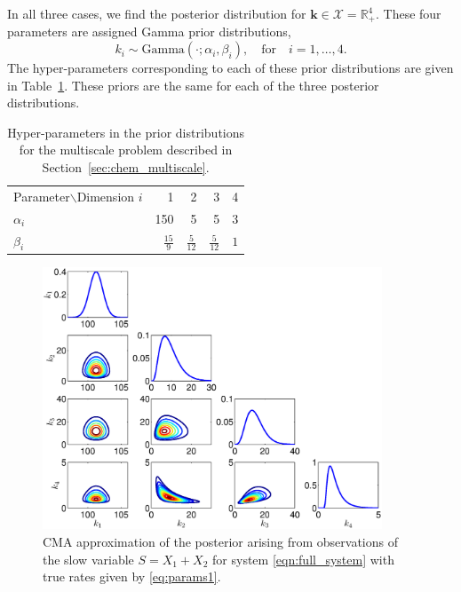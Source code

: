 \documentclass[final]{siamltex}
\begin{document}
In all three cases, we find the posterior distribution for $\mathbf{k}
\in \mathcal{X} = \mathbb{R}_+^4$. These four parameters are assigned Gamma prior distributions,
\begin{equation}
	k_i \sim \text{Gamma}(\cdot; \alpha_i, \beta_i), \quad \text{for} \quad i = 1, \dots, 4.
\end{equation}
The hyper-parameters corresponding to each of these prior distributions are given in Table~\ref{tab:multiscale_priors}. These priors are the same for each of the three posterior distributions.

\begin{table}
\centering

\begin{tabular}{lrrrr} 
	\toprule
	Parameter$\backslash$Dimension $i$ & 1 & 2 & 3 & 4  \\ \cmidrule(lr){1-5} 
	$\alpha_i$ & 150 & 5 & 5 & 3 \\
	$\beta_i$ & $\frac{15}{9}$ & $\frac{5}{12}$ & $\frac{5}{12}$ & $1$ \\ \bottomrule 
\end{tabular}
\caption{Hyper-parameters in the prior distributions for the multiscale problem described in Section~\ref{sec:chem_multiscale}.}
\label{tab:multiscale_priors}
\end{table}

\begin{figure}[htb]
\centering
\includegraphics[width=0.9\textwidth]{"images/Applications/CMA_posterior"}
\caption{CMA approximation of the posterior arising from observations of
  the slow variable $S = X_1 + X_2$ for system
  \eqref{eqn:full_system}  with true rates given by \eqref{eq:params1}.}
\label{fig:chem_CMA_posterior}
\end{figure}
\end{document}
